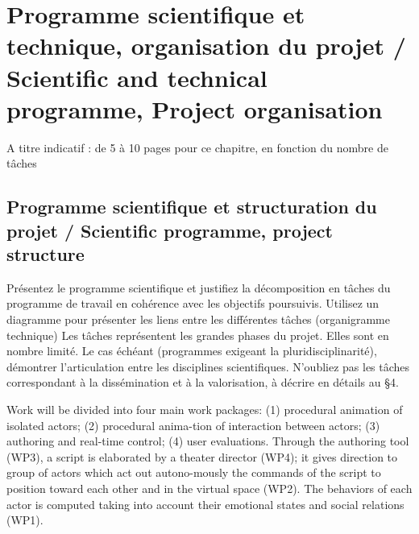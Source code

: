 
\section{Programme scientifique et technique, organisation du projet / Scientific and technical programme, Project organisation}
\begin{xcomment}  
A titre indicatif : de 5 à 10  pages pour ce chapitre, en fonction du nombre de tâches
\end{xcomment}

\subsection{Programme scientifique et structuration du projet  / Scientific programme, project structure}
\begin{xcomment}  
 Pr\'esentez le programme scientifique et justifiez la d\'ecomposition en tâches du programme de travail en coh\'erence avec les objectifs poursuivis. 
Utilisez un diagramme pour pr\'esenter les liens entre les diff\'erentes tâches (organigramme technique)
Les tâches repr\'esentent les grandes phases du projet. Elles sont en nombre limit\'e.
Le cas \'ech\'eant (programmes exigeant la pluridisciplinarit\'e), d\'emontrer l'articulation entre les disciplines scientifiques.
N'oubliez pas les tâches correspondant à la diss\'emination et à la valorisation, à d\'ecrire en d\'etails au §4.

\end{xcomment}



Work will be divided into four main work packages: (1) procedural animation of isolated actors; (2) procedural anima-tion of interaction between actors; (3) authoring and real-time control; (4) user evaluations. Through the authoring tool (WP3), a script is elaborated by a theater director (WP4); it gives direction to group of actors which act out autono-mously the commands of the script to position toward each other and in the virtual space (WP2). The behaviors of each actor is computed taking into account their emotional states and social relations (WP1).

\endinput